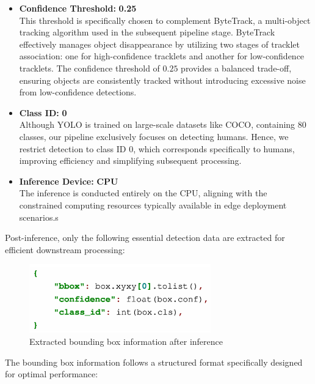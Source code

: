 \begin{itemize}
    \item \textbf{Confidence Threshold:} \textbf{0.25}\\
    This threshold is specifically chosen to complement ByteTrack, a multi-object tracking algorithm used in the subsequent pipeline stage. ByteTrack effectively manages object disappearance by utilizing two stages of tracklet association: one for high-confidence tracklets and another for low-confidence tracklets. The confidence threshold of $0.25$ provides a balanced trade-off, ensuring objects are consistently tracked without introducing excessive noise from low-confidence detections.


    \item \textbf{Class ID:} \textbf{0}\\
    Although YOLO is trained on large-scale datasets like COCO, containing 80 classes, our pipeline exclusively focuses on detecting humans. Hence, we restrict detection to class ID $0$, which corresponds specifically to humans, improving efficiency and simplifying subsequent processing.

    \item \textbf{Inference Device:} \textbf{CPU}\\
    The inference is conducted entirely on the CPU, aligning with the constrained computing resources typically available in edge deployment scenarios.s
\end{itemize}

Post-inference, only the following essential detection data are extracted for efficient downstream processing:

\begin{figure}[htbp]
    \centering
    \includegraphics[width=0.7\textwidth]{Figure/bboxes_yolo.png}
    \caption{Extracted bounding box information after inference}
    \label{fig:bboxes_yolo}
\end{figure}

The bounding box information follows a structured format specifically designed for optimal performance:

